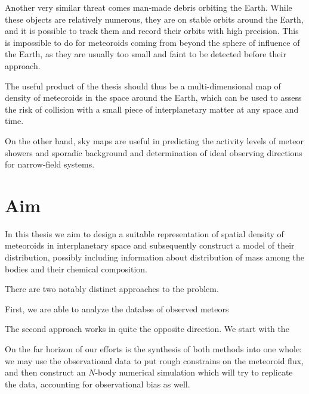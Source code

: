     Another very similar threat comes man-made debris orbiting the Earth.
    While these objects are relatively numerous, they are on stable orbits around
    the Earth, and it is possible to track them and record their orbits with high precision.
    This is impossible to do for meteoroids coming from beyond the sphere of influence of the Earth,
    as they are usually too small and faint to be detected before their approach.

    The useful product of the thesis should thus be a multi-dimensional map of density
    of meteoroids in the space around the Earth, which can be used to assess the risk
    of collision with a small piece of interplanetary matter at any space and time.

    On the other hand, sky maps are useful in predicting the activity levels of
    meteor showers and sporadic background and determination of ideal observing
    directions for narrow-field systems.


\section{Aim}
    In this thesis we aim to design a suitable representation of spatial density of meteoroids
    in interplanetary space and subsequently construct a model of their distribution,
    possibly including information about distribution of mass among the bodies and their chemical composition.

    There are two notably distinct approaches to the problem.

    First, we are able to analyze the databse of observed meteors

    The second approach works in quite the opposite direction. We start with the 

    On the far horizon of our efforts is the synthesis of both methods into one whole:
    we may use the observational data to put rough constrains on the meteoroid flux,
    and then construct an $N$-body numerical simulation which will try to replicate the data,
    accounting for observational bias as well.
